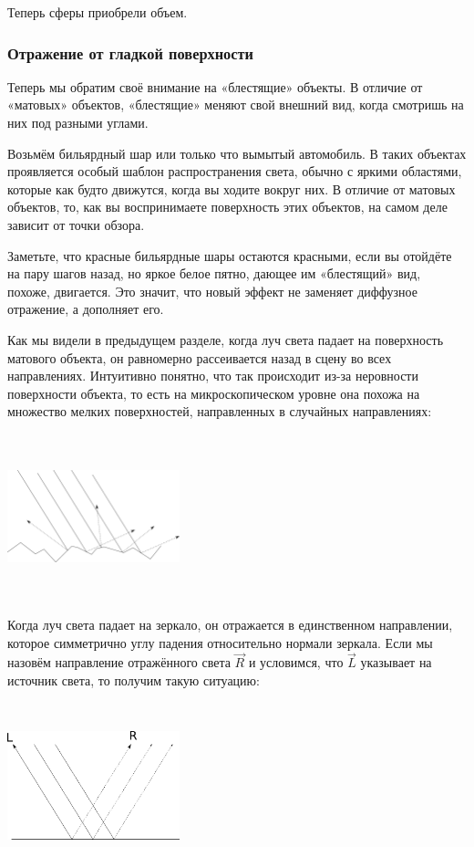 Теперь сферы приобрели объем.

\subsubsection{Отражение от гладкой поверхности}

Теперь мы обратим своё внимание на «блестящие» объекты. В отличие от «матовых» объектов, «блестящие» меняют свой внешний вид, когда смотришь на них под разными углами.

Возьмём бильярдный шар или только что вымытый автомобиль. В таких объектах проявляется особый шаблон распространения света, обычно с яркими областями, которые как будто движутся, когда вы ходите вокруг них. В отличие от матовых объектов, то, как вы воспринимаете поверхность этих объектов, на самом деле зависит от точки обзора.

Заметьте, что красные бильярдные шары остаются красными, если вы отойдёте на пару шагов назад, но яркое белое пятно, дающее им «блестящий» вид, похоже, двигается. Это значит, что новый эффект не заменяет диффузное отражение, а дополняет его.

Как мы видели в предыдущем разделе, когда луч света падает на поверхность матового объекта, он равномерно рассеивается назад в сцену во всех направлениях. Интуитивно понятно, что так происходит из-за неровности поверхности объекта, то есть на микроскопическом уровне она похожа на множество мелких поверхностей, направленных в случайных направлениях:

\includegraphics[width=5cm, height=4.8cm]{light_vectors3.png}

Когда луч света падает на зеркало, он отражается в единственном направлении, которое симметрично углу падения относительно нормали зеркала. Если мы назовём направление отражённого света $\vec{R}$ и условимся, что $\vec{L}$ указывает на источник света, то получим такую ситуацию:

\includegraphics[width=5cm, height=4.8cm]{light_vectors4.png}

